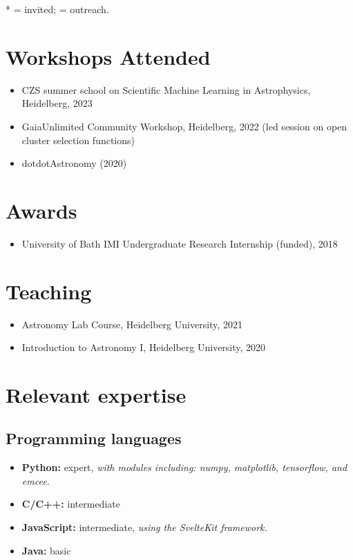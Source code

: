 \documentclass[12pt, letterpaper]{hunt-cv}
\begin{document}
* = invited; \cross = outreach.
\vspace{0.5cm}

\section*{Workshops Attended}

\begin{itemize}
    \item CZS summer school on Scientific Machine Learning in Astrophysics, Heidelberg, 2023
    \item GaiaUnlimited Community Workshop, Heidelberg, 2022 (led session on open cluster selection functions)
    \item dotdotAstronomy (2020)
\end{itemize}


\section*{Awards}

\begin{itemize}
    \item University of Bath IMI Undergraduate Research Internship (funded), 2018
\end{itemize}


\section*{Teaching}

\begin{itemize}
    \item Astronomy Lab Course, Heidelberg University, 2021
    \item Introduction to Astronomy I, Heidelberg University, 2020
\end{itemize}


\section*{Relevant expertise}

\subsection*{Programming languages}

\begin{itemize}
    \item \textbf{Python:} expert, \emph{with modules including: numpy, matplotlib, tensorflow, and emcee.}
    \item \textbf{C/C++:} intermediate
    \item \textbf{JavaScript:} intermediate, \emph{using the SvelteKit framework.}
    \item \textbf{Java:} basic
\end{itemize}
\end{document}
